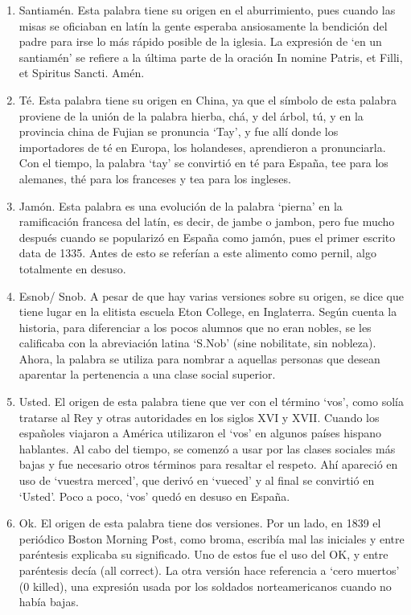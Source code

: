 \documentclass{mylib/reporte}
\begin{document}
\begin{enumerate}
	\item Santiamén. Esta palabra tiene su origen en el aburrimiento, pues cuando las misas se oficiaban en latín la gente esperaba ansiosamente la bendición del padre para irse lo más rápido posible de la iglesia. La expresión de ‘en un santiamén’ se refiere a la última parte de la oración In nomine Patris, et Filli, et Spiritus Sancti. Amén.
	\item Té. Esta palabra tiene su origen en China, ya que el símbolo de esta palabra proviene de la unión de la palabra hierba, chá, y del árbol, tú, y en la provincia china de Fujian se pronuncia ‘Tay’, y fue allí donde los importadores de té en Europa, los holandeses, aprendieron a pronunciarla. Con el tiempo, la palabra ‘tay’ se convirtió en té para España, tee para los alemanes, thé para los franceses y tea para los ingleses.
	\item Jamón. Esta palabra es una evolución de la palabra ‘pierna’ en la ramificación francesa del latín, es decir, de jambe o jambon, pero fue mucho después cuando se popularizó en España como jamón, pues el primer escrito data de 1335. Antes de esto se referían a este alimento como pernil, algo totalmente en desuso.
	\item Esnob/ Snob. A pesar de que hay varias versiones sobre su origen, se dice que tiene lugar en la elitista escuela Eton College, en Inglaterra. Según cuenta la historia, para diferenciar a los pocos alumnos que no eran nobles, se les calificaba con la abreviación latina ‘S.Nob’ (sine nobilitate, sin nobleza). Ahora, la palabra se utiliza para nombrar a aquellas personas que desean aparentar la pertenencia a una clase social superior.
	\item Usted. El origen de esta palabra tiene que ver con el término ‘vos’, como solía tratarse al Rey y otras autoridades en los siglos XVI y XVII. Cuando los españoles viajaron a América utilizaron el ‘vos’ en algunos países hispano hablantes. Al cabo del tiempo, se comenzó a usar por las clases sociales más bajas y fue necesario otros términos para resaltar el respeto. Ahí apareció en uso de ‘vuestra merced’, que derivó en ‘vueced’ y al final se convirtió en ‘Usted’. Poco a poco, ‘vos’ quedó en desuso en España.
	\item Ok. El origen de esta palabra tiene dos versiones. Por un lado, en 1839 el periódico Boston Morning Post, como broma, escribía mal las iniciales y entre paréntesis explicaba su significado. Uno de estos fue el uso del OK, y entre paréntesis decía (all correct). La otra versión hace referencia a ‘cero muertos’ (0 killed), una expresión usada por los soldados norteamericanos cuando no había bajas.

\end{enumerate}
\end{document}
